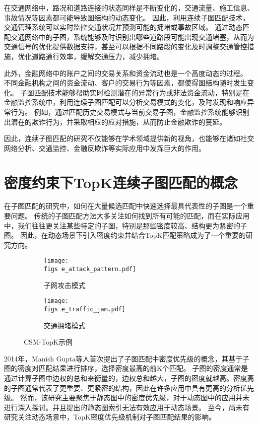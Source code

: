 在交通网络中，路况和道路连接的状态同样是不断变化的，交通流量、施工信息、事故情况等因素都可能导致图结构的动态变化。
因此，利用连续子图匹配技术，交通管理系统可以实时监控交通状况并预测可能的拥堵或事故区域。
通过动态匹配交通网络中的子图，系统能够及时识别出哪些道路段可能出现交通堵塞，从而为交通信号的优化提供数据支持，甚至可以根据不同路段的变化及时调整交通管控措施，优化道路通行效率，缓解交通压力，减少拥堵。

此外，金融网络中的账户之间的交易关系和资金流动也是一个高度动态的过程。
不同金融机构之间的资金流动、客户的交易行为等因素，都使得图结构随时发生变化。
子图匹配技术能够帮助实时检测潜在的异常行为或非法资金流动，特别是在金融监控系统中，利用连续子图匹配可以分析交易模式的变化，及时发现和响应异常行为。
例如，通过匹配历史交易模式与当前交易子图，金融监控系统能够识别出潜在的欺诈行为，并采取相应的应对措施，从而防止金融欺诈的蔓延。

因此，连续子图匹配的研究不仅能够在学术领域提供新的视角，也能够在诸如社交网络分析、交通监控、金融反欺诈等实际应用中发挥巨大的作用。

\section{密度约束下TopK连续子图匹配的概念}
在子图匹配的研究中，如何在大量候选匹配中快速选择最具代表性的子图是一个重要问题。
传统的子图匹配方法大多关注如何找到所有可能的匹配，而在实际应用中，我们往往更关注某些特定的子图，特别是那些密度较高、结构更为紧密的子图。
因此，在动态场景下引入密度约束并结合TopK匹配策略成为了一个重要的研究方向。

\begin{figure}[h!]
    \def\wscorevone{0.49}
    \centering
        \begin{subfigure}[t]{\wscorevone\linewidth}
            \centering
            \resizebox{\linewidth}{!}
            {
                \texttt{[image: \\figs e\_attack\_pattern.pdf]}
            }
            \caption{子网攻击模式~\cite{static-topk-Gupta-DBLP:conf/icde/GuptaGYCH14}}
            \label{fig:example_attack_pattern}
        \end{subfigure}
        \hfill
        \begin{subfigure}[t]{\wscorevone\linewidth}
            \centering
            \resizebox{\linewidth}{!}
            {
                \texttt{[image: \\figs e\_traffic\_jam.pdf]}
            }
            \caption{交通拥堵模式~\cite{traffic-graph-matching-DBLP:journals/pvldb/SongGCW14}}
            \label{fig:example_traffic_jam}
        \end{subfigure}
        \label{fig:definition}
        \caption{CSM-TopK示例}
    \end{figure}
2014年，Manish Gupta等人首次提出了子图匹配中密度优先级的概念\cite{static-topk-Gupta-DBLP:conf/icde/GuptaGYCH14}，其基于子图的密度对匹配结果进行排序，选择密度最高的前K个匹配。
子图的密度通常是通过计算子图中边权的总和来衡量的，边权总和越大，子图的密度就越高。密度高的子图通常代表了更重要、更紧密的结构，因此在许多应用中具有更高的分析优先级。
然而，该研究主要聚焦于静态图中的密度优先级，对于动态图中的应用并未进行深入探讨。并且提出的静态图索引无法有效应用于动态场景。
至今，尚未有研究关注动态场景中，TopK密度优先级机制对子图匹配结果的影响。

